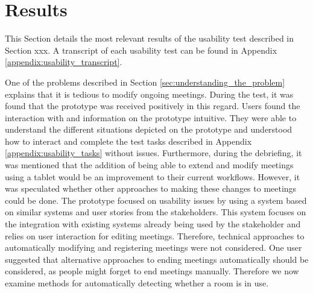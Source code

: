 \section{Results}\label{sec:usability_evaluation_results}
This Section details the most relevant results of the usability test described in Section xxx.
A transcript of each usability test can be found in Appendix \ref{appendix:usability_transcript}.

One of the problems described in Section \ref{sec:understanding_the_problem} explains that it is tedious to modify ongoing meetings. 
During the test, it was found that the prototype was received positively in this regard. 
Users found the interaction with and information on the prototype intuitive. 
They were able to understand the different situations depicted on the prototype and understood how to interact and complete the test tasks described in Appendix \ref{appendix:usability_tasks} without issues. 
Furthermore, during the debriefing, it was mentioned that the addition of being able to extend and modify meetings using a tablet would be an improvement to their current workflows.
However, it was speculated whether other approaches to making these changes to meetings could be done. 
The prototype focused on usability issues by using a system based on similar systems and user stories from the stakeholders. 
This system focuses on the integration with existing systems already being used by the stakeholder and relies on user interaction for editing meetings. 
Therefore, technical approaches to automatically modifying and registering meetings were not considered. 
One user suggested that alternative approaches to ending meetings automatically should be considered, as people might forget to end meetings manually.
Therefore we now examine methods for automatically detecting whether a room is in use.
